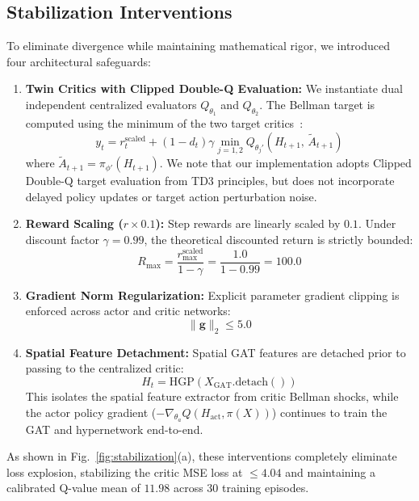 \documentclass[journal]{IEEEtran}
\begin{document}
\subsection{Stabilization Interventions}
To eliminate divergence while maintaining mathematical rigor, we introduced four architectural safeguards:
\begin{enumerate}
    \item \textbf{Twin Critics with Clipped Double-Q Evaluation:} We instantiate dual independent centralized evaluators $Q_{\theta_1}$ and $Q_{\theta_2}$. The Bellman target is computed using the minimum of the two target critics~\cite{fujimoto2018addressing}:
    \begin{equation}
    y_t = r_t^{\text{scaled}} + (1 - d_t) \gamma \min_{j=1,2} Q_{\theta_j'}\left(H_{t+1}, \, \tilde{A}_{t+1}\right)
    \label{eq:clipped_double_q}
    \end{equation}
    where $\tilde{A}_{t+1} = \pi_{\phi'}(H_{t+1})$. We note that our implementation adopts Clipped Double-Q target evaluation from TD3 principles, but does not incorporate delayed policy updates or target action perturbation noise.
    \item \textbf{Reward Scaling ($r \times 0.1$):} Step rewards are linearly scaled by $0.1$. Under discount factor $\gamma = 0.99$, the theoretical discounted return is strictly bounded:
    \begin{equation}
    R_{\max} = \frac{r_{\max}^{\text{scaled}}}{1 - \gamma} = \frac{1.0}{1 - 0.99} = 100.0
    \end{equation}
    \item \textbf{Gradient Norm Regularization:} Explicit parameter gradient clipping is enforced across actor and critic networks:
    \begin{equation}
    \|\mathbf{g}\|_2 \le 5.0
    \end{equation}
    \item \textbf{Spatial Feature Detachment:} Spatial GAT features are detached prior to passing to the centralized critic:
    \begin{equation}
    H_t = \text{HGP}\left(X_{\text{GAT}}.\text{detach}()\right)
    \end{equation}
    This isolates the spatial feature extractor from critic Bellman shocks, while the actor policy gradient ($-\nabla_{\theta_a} Q(H_{\text{act}}, \pi(X))$) continues to train the GAT and hypernetwork end-to-end.
\end{enumerate}

As shown in Fig.~\ref{fig:stabilization}(a), these interventions completely eliminate loss explosion, stabilizing the critic MSE loss at $\le 4.04$ and maintaining a calibrated Q-value mean of $11.98$ across 30 training episodes.
\end{document}
